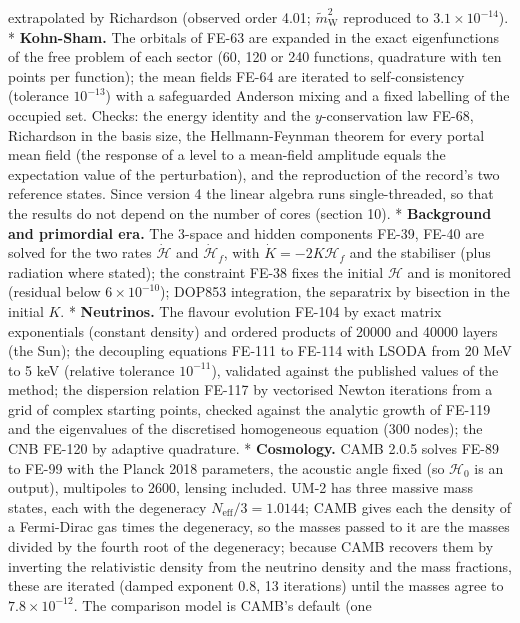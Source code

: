 \documentclass[
  10pt,
]{article}
\begin{document}
extrapolated by Richardson (observed order 4.01;
\(\tilde m_{\mathrm{W}}^2\) reproduced to \(3.1\times10^{-14}\)). *
\textbf{Kohn-Sham.} The orbitals of FE-63 are expanded in the exact
eigenfunctions of the free problem of each sector (60, 120 or 240
functions, quadrature with ten points per function); the mean fields
FE-64 are iterated to self-consistency (tolerance \(10^{-13}\)) with a
safeguarded Anderson mixing and a fixed labelling of the occupied set.
Checks: the energy identity and the \(y\)-conservation law FE-68,
Richardson in the basis size, the Hellmann-Feynman theorem for every
portal mean field (the response of a level to a mean-field amplitude
equals the expectation value of the perturbation), and the reproduction
of the record's two reference states. Since version 4 the linear algebra
runs single-threaded, so that the results do not depend on the number of
cores (section 10). * \textbf{Background and primordial era.} The
3-space and hidden components FE-39, FE-40 are solved for the two rates
\(\dot{\mathcal{H}}\) and \(\dot{\mathcal{H}}_f\), with
\(\dot K = -2K\mathcal{H}_f\) and the stabiliser (plus radiation where
stated); the constraint FE-38 fixes the initial \(\mathcal{H}\) and is
monitored (residual below \(6\times10^{-10}\)); DOP853 integration, the
separatrix by bisection in the initial \(K\). * \textbf{Neutrinos.} The
flavour evolution FE-104 by exact matrix exponentials (constant density)
and ordered products of 20000 and 40000 layers (the Sun); the decoupling
equations FE-111 to FE-114 with LSODA from 20 MeV to 5 keV (relative
tolerance \(10^{-11}\)), validated against the published values of the
method; the dispersion relation FE-117 by vectorised Newton iterations
from a grid of complex starting points, checked against the analytic
growth of FE-119 and the eigenvalues of the discretised homogeneous
equation (300 nodes); the CNB FE-120 by adaptive quadrature. *
\textbf{Cosmology.} CAMB 2.0.5 solves FE-89 to FE-99 with the Planck
2018 parameters, the acoustic angle fixed (so \(\mathcal{H}_0\) is an
output), multipoles to 2600, lensing included. UM-2 has three massive
mass states, each with the degeneracy \(N_{\mathrm{eff}}/3 = 1.0144\);
CAMB gives each the density of a Fermi-Dirac gas times the degeneracy,
so the masses passed to it are the masses divided by the fourth root of
the degeneracy; because CAMB recovers them by inverting the relativistic
density from the neutrino density and the mass fractions, these are
iterated (damped exponent 0.8, 13 iterations) until the masses agree to
\(7.8\times10^{-12}\). The comparison model is CAMB's default (one
\end{document}
